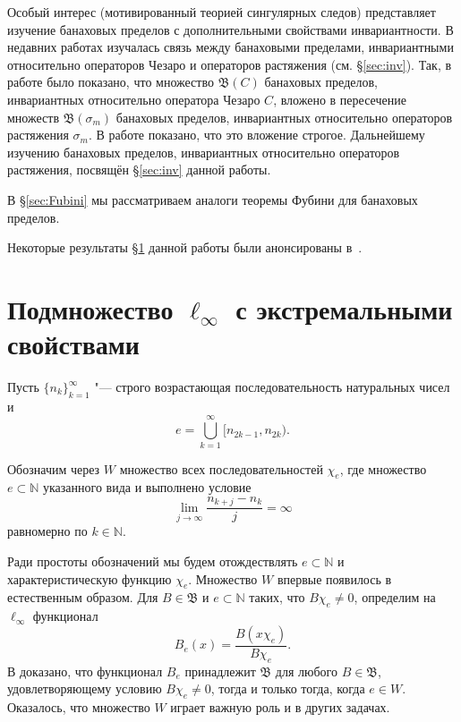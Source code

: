 \documentclass[12pt]{article}
\def\N{{\mathbb{N}}}
\def\B{{\mathfrak{B}}}
\begin{document}
Особый интерес (мотивированный теорией сингулярных следов) представляет изучение банаховых пределов с дополнительными свойствами инвариантности.
В недавних работах изучалась связь между банаховыми пределами, инвариантными относительно операторов Чезаро и операторов растяжения (см. \S\ref{sec:inv}).
Так, в работе \cite{SSUZ2} было показано, что множество $\mathfrak{B}(C)$ банаховых пределов, инвариантных относительно оператора Чезаро $C$, вложено в пересечение множеств $\mathfrak{B}(\sigma_m)$ банаховых пределов, инвариантных относительно операторов растяжения $\sigma_m$.
В работе \cite{SSUZ3} показано, что это вложение строгое.
Дальнейшему изучению банаховых пределов, инвариантных относительно операторов растяжения, посвящён \S\ref{sec:inv} данной работы.

В \S\ref{sec:Fubini} мы рассматриваем аналоги теоремы Фубини для банаховых пределов.


Некоторые результаты \S \ref{sec:W} данной работы были анонсированы в~\cite{AvSU}.







\section{Подмножество $\ell_\infty$ с экстремальными свойствами}\label{sec:W}

Пусть $\{n_k\}_{k=1}^\infty$ "--- строго возрастающая  последовательность натуральных чисел и
\begin{equation}\label{e}
e =\bigcup\limits_{k=1}^\infty \lbrack n_{2k-1},n_{2k}).
\end{equation}

Обозначим через $W$ множество всех последовательностей $\chi_e$, где множество  $e \subset \N$ указанного вида
и выполнено условие
\begin{equation}\label{growth_cond}
    \lim\limits_{j\to\infty}\frac{n_{k+j}-n_k}j=\infty
\end{equation}
равномерно по $k\in \mathbb N$.

Ради простоты обозначений мы будем отождествлять $e \subset \N$ и характеристическую функцию $\chi_e$. Множество $W$ впервые появилось в~\cite[\S 5]{SSU2} естественным образом. Для $B\in \B$ и $e\subset \N$ таких, что $B\chi_e\neq 0$, определим на $\ell_\infty$ функционал
$$B_e(x)=\frac{B(x\chi_e)}{B\chi_e}.$$
В \cite[Т. 25]{SSU2} доказано, что функционал $B_e$ принадлежит $\B$ для любого $B\in \B$, удовлетворяющему условию $B\chi_e\neq 0$, тогда и только тогда, когда $e\in W$. Оказалось, что множество $W$ играет важную роль и в других задачах.
\end{document}
